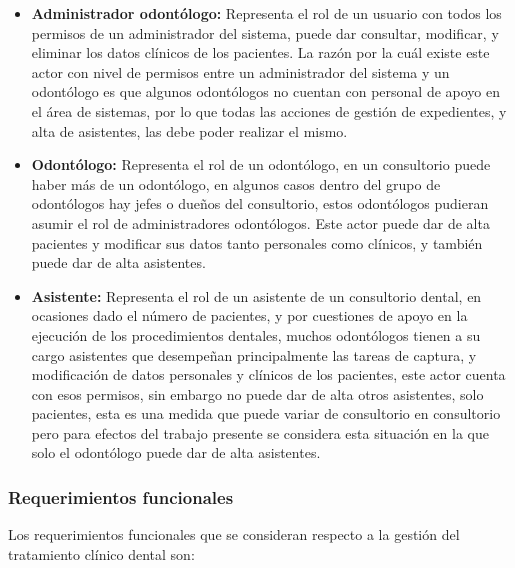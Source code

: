 \begin{itemize}
                
\item \textbf{Administrador odontólogo:} Representa el rol de un usuario con todos los permisos de un administrador del sistema, puede dar consultar, modificar, y eliminar los datos clínicos de los pacientes. La razón por la cuál existe este actor con nivel de permisos entre un administrador del sistema y un odontólogo es que algunos odontólogos no cuentan con personal de apoyo en el área de sistemas, por lo que todas las acciones de gestión de expedientes, y alta de asistentes, las debe poder realizar el mismo.
                 
\item \textbf{Odontólogo:} Representa el rol de un odontólogo, en un consultorio puede haber más de un odontólogo, en algunos casos dentro del grupo de odontólogos hay jefes o dueños del consultorio, estos odontólogos pudieran asumir el rol de administradores odontólogos. Este actor puede dar de alta pacientes y modificar sus datos tanto personales como clínicos, y también puede dar de alta asistentes.
                 
\item \textbf{Asistente:} Representa el rol de un asistente de un consultorio dental, en ocasiones dado el número de pacientes, y por cuestiones de apoyo en la ejecución de los procedimientos dentales, muchos odontólogos tienen a su cargo asistentes que desempeñan principalmente las tareas de captura, y modificación de datos personales y clínicos de los pacientes, este actor cuenta con esos permisos, sin embargo no puede dar de alta otros asistentes, solo pacientes, esta es una medida que puede variar de consultorio en consultorio pero para efectos del trabajo presente se considera esta situación en la que solo el odontólogo puede dar de alta asistentes.

\end{itemize}

\newpage
\subsubsection{Requerimientos funcionales}

Los requerimientos funcionales que se consideran respecto a la gestión del tratamiento clínico dental son:


